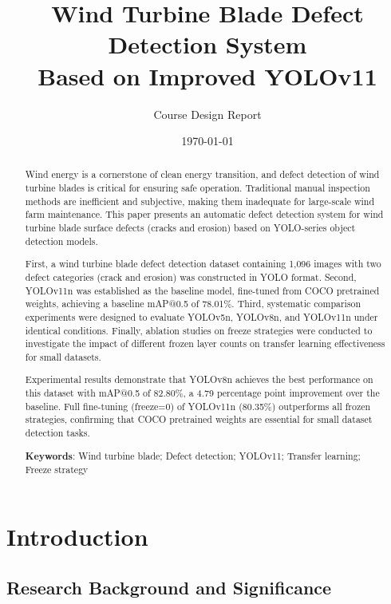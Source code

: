 \documentclass[12pt,a4paper]{article}
\title{\textbf{Wind Turbine Blade Defect Detection System\\Based on Improved YOLOv11}}
\author{Course Design Report}
\date{\today}
\begin{document}
\maketitle

\begin{abstract}
Wind energy is a cornerstone of clean energy transition, and defect detection of wind turbine blades is critical for ensuring safe operation. Traditional manual inspection methods are inefficient and subjective, making them inadequate for large-scale wind farm maintenance. This paper presents an automatic defect detection system for wind turbine blade surface defects (cracks and erosion) based on YOLO-series object detection models.

First, a wind turbine blade defect detection dataset containing 1,096 images with two defect categories (crack and erosion) was constructed in YOLO format. Second, YOLOv11n was established as the baseline model, fine-tuned from COCO pretrained weights, achieving a baseline mAP@0.5 of 78.01\%. Third, systematic comparison experiments were designed to evaluate YOLOv5n, YOLOv8n, and YOLOv11n under identical conditions. Finally, ablation studies on freeze strategies were conducted to investigate the impact of different frozen layer counts on transfer learning effectiveness for small datasets.

Experimental results demonstrate that YOLOv8n achieves the best performance on this dataset with mAP@0.5 of 82.80\%, a 4.79 percentage point improvement over the baseline. Full fine-tuning (freeze=0) of YOLOv11n (80.35\%) outperforms all frozen strategies, confirming that COCO pretrained weights are essential for small dataset detection tasks.

\medskip
\noindent\textbf{Keywords}: Wind turbine blade; Defect detection; YOLOv11; Transfer learning; Freeze strategy
\end{abstract}

\newpage
\tableofcontents
\newpage

\section{Introduction}

\subsection{Research Background and Significance}
\end{document}

